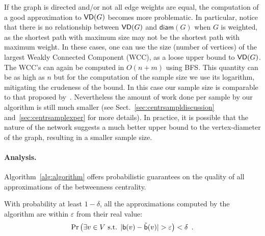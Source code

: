 If the graph is directed and/or not all edge weights are equal, the computation
of a good approximation to $\mathsf{VD}(G)$ becomes more problematic. In particular,
notice that there is no relationship between $\mathsf{VD}(G)$ and $\mathsf{diam}(G)$
when $G$ is weighted, as the shortest path with maximum size may not be the
shortest path with maximum weight. In these cases, one can use the size (number
of vertices) of the largest Weakly Connected Component (WCC), as a loose upper
bound to $\mathsf{VD}(G)$. The WCC's can again be computed in $O(n+m)$ using BFS.  This
quantity can be as high as $n$ but for the computation of the sample size we use
its logarithm, mitigating the crudeness of the bound. In this case our sample
size is comparable to that proposed by~\citet{BrandesP07}. %
Nevertheless the amount of work done per sample by our algorithm is still much
smaller (see Sect.~\ref{sec:centrsampldiscussion} and~\ref{sec:centrsamplexper} for more
details). In practice, it is possible that the nature of the network suggests a
much better upper bound to the vertex-diameter of the graph, resulting in a
smaller sample size. %

\paragraph{Analysis.}\label{sec:centrsamplanalysis}
Algorithm~\ref{alg:algorithm} offers
probabilistic guarantees on the quality of all approximations of the betweenness
centrality.
\begin{lemma}\label{lem:correctness}
  With probability at least $1-\delta$, all the approximations computed by the
  algorithm are within $\varepsilon$ from their real value:
  \[
  \Pr\left(\exists v\in V \mbox{ s.t. }
  |\betw(v)-\tilde\betw(v)|>\varepsilon\right)<\delta\enspace .
  \]
\end{lemma}

